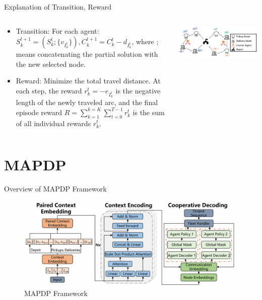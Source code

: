 \documentclass{beamer}
\begin{document}
\begin{frame}{Explanation of Transition, Reward}
	\begin{columns}
		\begin{column}{0.5\textwidth}
			\small
			\begin{itemize}
				\item Transition: For each agent: $S_k^{t+1}=(S_k^t;\{v_{I_k^t}\}), C_k^{t+1}=C_k^t-d_{I_k^t}$, where ; means concatenating the partial solution with the new selected node.
				\item Reward: Minimize the total travel distance. At each step, the reward $r_k^t=-e_{I_k^t}$  is the negative length of the newly traveled arc, and the final episode reward $R=\sum_{k=1}^{k=K}\sum_{t=0}^{T-1}r_{k}^{t}$ \footnotemark  is the sum of all individual rewards $r_k^t$.
			\end{itemize}
		\end{column}
		\begin{column}{0.5\textwidth}
			\centering
			\includegraphics[width=\textwidth]{show.png} %
		\end{column}
	\end{columns}
\end{frame}

\section{MAPDP}

\begin{frame}{Overview of MAPDP Framework}
	\begin{figure}
		\centering
		\hspace{-1.2cm} %
		\includegraphics[scale=0.199]{model_structure.png}
		\caption{MAPDP Framework}
	\end{figure}
\end{frame}
\end{document}
